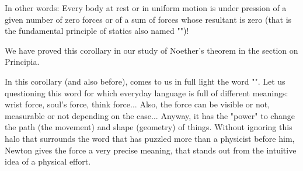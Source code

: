 	In other words: Every body at rest or in uniform motion is under pression of a given number of zero forces or of a sum of forces whose resultant is zero (that is the fundamental principle of statics also named "")!
	
	\begin{tcolorbox}[title=Remark,colframe=black,arc=10pt]
	We have proved this corollary in our study of Noether's theorem in the section on Principia.
	\end{tcolorbox}
	
	In this corollary (and also before), comes to us in full light the word "". Let us questioning this word for which everyday language is full of different meanings: wrist force, soul's force, think force... Also, the force can be visible or not, measurable or not depending on the case... Anyway, it has the "power" to change the path (the movement) and shape (geometry) of things. Without ignoring this halo that surrounds the word that has puzzled more than a physicist before him, Newton gives the force a very precise meaning, that stands out from the intuitive idea of a physical effort.
	
